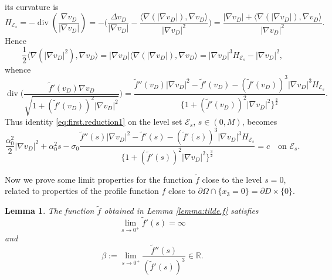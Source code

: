 \documentclass[10pt,reqno,a4paper]{article}
\numberwithin{equation}{section}
\theoremstyle{plain}
\newtheorem{lemma}[theorem]{Lemma}
\theoremstyle{definition}
\newcommand{\R}{{\mathbb R}}
\newcommand{\mE}{\mathcal{E}}
\newcommand{\Om}{\Omega}
\newcommand{\pa}{\partial}
\renewcommand{\div}{\operatorname{div}} %
\begin{document}
its curvature is
\[
H_{\mE_s} = - \div \left(\frac{\nabla v_D}{|\nabla v_D|}\right)
= - \Big( \frac{\Delta v_D}{|\nabla v_D|} 
- \frac{\langle  \nabla (|\nabla v_D|), \nabla v_D\rangle}{|\nabla v_D|^2} \Big)
= \frac{|\nabla v_D| + \langle  \nabla (|\nabla v_D|), \nabla v_D\rangle}{|\nabla v_D|^2}.
\] 
Hence
\[
\frac12 \langle \nabla (|\nabla v_D|^2 ) , \nabla v_D\rangle 
= |\nabla v_D| \langle \nabla ( |\nabla v_D| ) , \nabla v_D\rangle 
= |\nabla v_D|^3 H_{\mE_s} - |\nabla v_D|^2,
\]
whence 
\[
\div \bigg( \frac{\tilde f'(v_D) \nabla v_D }{ \sqrt{ 1 + (\tilde f'(v_D))^2 |\nabla v_D|^2} } \bigg ) 
= \frac{ \tilde f''(v_D) |\nabla v_D|^2 - \tilde f'(v_D) - (\tilde f'(v_D))^3 |\nabla v_D|^3 H_{\mE_s} }
{ \{ 1 + (\tilde f'(v_D))^2 |\nabla v_D|^2 \}^\frac32 }.
\]
Thus identity \eqref{eq:first.reduction1} on the level set $\mE_s$, $s \in (0,M)$, 
becomes
\begin{equation} \label{eq:on.level.set}
\frac{\alpha_0^2}{2} |\nabla v_D|^2 
+ \alpha_0^2 s 
- \sigma_0 \frac{ \tilde f''(s) |\nabla v_D|^2 - \tilde f'(s) - (\tilde f'(s))^3 |\nabla v_D|^3 H_{\mE_s} }
{ \{ 1 + (\tilde f'(s))^2 |\nabla v_D|^2 \}^\frac32 }
= c \quad \text{on } \mE_s.
\end{equation} 

Now we prove some limit properties for the function $\tilde f$ close to the level $s=0$, 
related to properties of the profile function $f$ 
close to $\pa \Om \cap \{ x_3 = 0 \} = \pa D \times \{ 0 \}$. 

\begin{lemma}
The function $\tilde f$ obtained in Lemma \ref{lemma:tilde.f} satisfies 
\begin{equation} \label{lim.tilde.f.der.infty}
\lim_{s \to 0^+} \tilde f'(s) = \infty
\end{equation}
and 
\begin{equation}\label{eq:defn.beta}
\beta := \lim_{s \to 0^+} \frac{ \tilde f''(s) }{ (\tilde f'(s))^3 } \in \R.
\end{equation}
\end{lemma}
\end{document}
